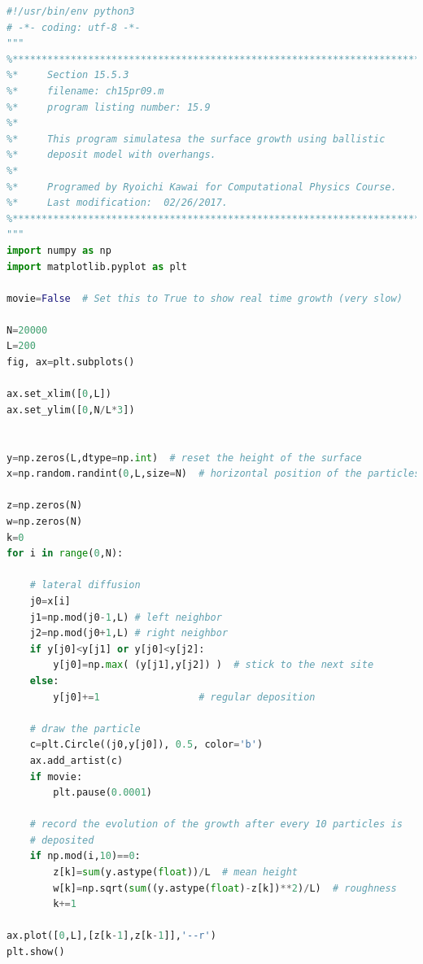 \bigskip
\noindent
\program
\footnotesize
\begin{lstlisting}[language=python]
#!/usr/bin/env python3
# -*- coding: utf-8 -*-
"""
%**************************************************************************
%*     Section 15.5.3                                                     *
%*     filename: ch15pr09.m                                               *
%*     program listing number: 15.9                                       *
%*                                                                        *
%*     This program simulatesa the surface growth using ballistic         *
%*     deposit model with overhangs.                                      *
%*                                                                        *
%*     Programed by Ryoichi Kawai for Computational Physics Course.       *
%*     Last modification:  02/26/2017.                                    *
%**************************************************************************
"""
import numpy as np
import matplotlib.pyplot as plt

movie=False  # Set this to True to show real time growth (very slow)

N=20000
L=200
fig, ax=plt.subplots()

ax.set_xlim([0,L])
ax.set_ylim([0,N/L*3])


y=np.zeros(L,dtype=np.int)  # reset the height of the surface
x=np.random.randint(0,L,size=N)  # horizontal position of the particles

z=np.zeros(N)
w=np.zeros(N)
k=0
for i in range(0,N):
    
    # lateral diffusion
    j0=x[i]
    j1=np.mod(j0-1,L) # left neighbor
    j2=np.mod(j0+1,L) # right neighbor
    if y[j0]<y[j1] or y[j0]<y[j2]:
        y[j0]=np.max( (y[j1],y[j2]) )  # stick to the next site
    else:
        y[j0]+=1                 # regular deposition
        
    # draw the particle
    c=plt.Circle((j0,y[j0]), 0.5, color='b')
    ax.add_artist(c)
    if movie:
        plt.pause(0.0001)
    
    # record the evolution of the growth after every 10 particles is
    # deposited    
    if np.mod(i,10)==0:
        z[k]=sum(y.astype(float))/L  # mean height
        w[k]=np.sqrt(sum((y.astype(float)-z[k])**2)/L)  # roughness
        k+=1
        
ax.plot([0,L],[z[k-1],z[k-1]],'--r')
plt.show()
\end{lstlisting}
\normalsize

\vfill

\newpage


\vfill